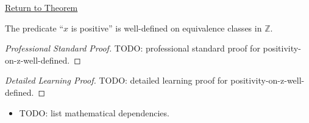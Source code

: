 \newpage
{}
\label{prf:positivity-on-z-well-defined}

\begin{remark*}[Return]
\hyperref[thm:positivity-on-z-well-defined]{Return to Theorem}
\end{remark*}

\begin{theorem*}
The predicate ``$x$ is positive'' is well-defined on equivalence classes in
$\mathbb{Z}$.
\end{theorem*}

\begin{proof}[Professional Standard Proof]
\LRAProofBodyStart
TODO: professional standard proof for positivity-on-z-well-defined.
\end{proof}

\begin{proof}[Detailed Learning Proof]
\LRAProofBodyStart
TODO: detailed learning proof for positivity-on-z-well-defined.
\end{proof}

\begin{remark*}
\end{remark*}

\begin{dependencies}
\begin{itemize}
  \item TODO: list mathematical dependencies.
\end{itemize}
\end{dependencies}

\clearpage
